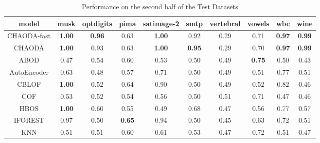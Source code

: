 \begin{table*}[!b]
\renewcommand{\arraystretch}{1.25}
\caption{Performance on the second half of the Test Datasets}
\label{table:results:test-performance-2}
\centering
\begin{tabular}{|c|c|c|c|c|c|c|c|c|c|}
\hline
\textbf{model} & \textbf{musk} & \textbf{optdigits} & \textbf{pima} & \textbf{satimage-2} & \textbf{smtp} & \textbf{vertebral} & \textbf{vowels} &  \textbf{wbc} & \textbf{wine} \\
\hline
        CHAODA-fast & \textbf{1.00} &      \textbf{0.96} &          0.63 &       \textbf{1.00} &          0.92 &               0.29 &            0.71 & \textbf{0.97} & \textbf{0.99} \\
\hline
        CHAODA & \textbf{1.00} &               0.93 &          0.63 &       \textbf{1.00} & \textbf{0.95} &               0.29 &            0.70 & \textbf{0.97} & \textbf{0.99} \\
\hline
                ABOD &          0.47 &               0.54 &          0.60 &                0.53 &          0.50 &               0.49 &   \textbf{0.75} &          0.50 &          0.43 \\
\hline
        AutoEncoder &          0.63 &               0.48 &          0.57 &                0.71 &          0.50 &               0.49 &            0.51 &          0.77 &          0.51 \\
\hline
                CBLOF & \textbf{1.00} &               0.52 &          0.64 &                0.90 &          0.50 &               0.49 &            0.52 &          0.82 &          0.46 \\
\hline
                COF &          0.53 &               0.52 &          0.54 &                0.56 &          0.50 &               0.51 &            0.71 &          0.47 &          0.46 \\
\hline
                HBOS & \textbf{1.00} &               0.60 &          0.55 &                0.49 &          0.68 &               0.47 &            0.56 &          0.77 &          0.57 \\
\hline
        IFOREST &          0.97 &               0.50 & \textbf{0.65} &                0.94 &          0.50 &               0.45 &            0.63 &          0.72 &          0.51 \\
\hline
                KNN &          0.51 &               0.51 &          0.60 &                0.61 &          0.53 &               0.47 &            0.72 &          0.51 &          0.47 \\
\hline

\end{tabular}
\end{table*}
